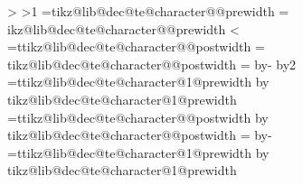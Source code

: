 {        %
        \pgfmathdivide{\the\pgf@x}{\the\pgf@y}%
        \let\tikz@lib@dec@characterwidthscale=\pgfmathresult%
        \pgfmathloop
        \ifnum\pgfmathcounter>\tikz@lib@dec@te@charactertotalcount\relax%
        \else%
        \ifnum\pgfmathcounter>1\relax%
          \pgf@x=\csname tikz@lib@dec@te@character@\pgfmathcounter @prewidth\endcsname\relax%
          \pgf@x=\tikz@lib@dec@characterwidthscale\pgf@x%
            \expandafter\edef\csname tikz@lib@dec@te@character@\pgfmathcounter @prewidth\endcsname{\the\pgf@x}%
          \fi%
          \ifnum\pgfmathcounter<\tikz@lib@dec@te@charactertotalcount\relax%
            \pgf@x=\csname tikz@lib@dec@te@character@\pgfmathcounter @postwidth\endcsname\relax%
            \pgf@x=\tikz@lib@dec@characterwidthscale\pgf@x%
            \expandafter\edef\csname tikz@lib@dec@te@character@\pgfmathcounter @postwidth\endcsname{\the\pgf@x}%
          \fi%
        \repeatpgfmathloop%
        \tikz@lib@dec@te@addwidthstoparameters%
        \let\tikz@lib@dec@te@textwidth=\pgfdecoratedpathlength%
      \else%
        \ifx\tikz@lib@dec@align\tikz@lib@dec@align@center@text%
           \pgf@x=\pgfdecoratedpathlength\relax%
           \advance\pgf@x by-\tikz@lib@dec@te@textwidth\relax%
           \ifdim\pgf@x<0pt\relax%
             \pgf@x=0pt\relax%
           \fi%
           \divide\pgf@x by2\relax%
           \pgf@xa=\csname tikz@lib@dec@te@character@1@prewidth\endcsname\relax%
           \advance\pgf@xa by\pgf@x%
           \expandafter\edef\csname tikz@lib@dec@te@character@1@prewidth\endcsname{\the\pgf@xa}%
           \pgf@xa=\csname tikz@lib@dec@te@character@\tikz@lib@dec@te@charactertotalcount @postwidth\endcsname\relax%
           \advance\pgf@xa by\pgf@x%
           \expandafter\edef\csname tikz@lib@dec@te@character@\tikz@lib@dec@te@charactertotalcount @postwidth\endcsname{\the\pgf@xa}%
        \else%
          \ifx\tikz@lib@dec@align\tikz@lib@dec@align@right@text%
            \pgf@x=\pgfdecoratedpathlength\relax%
            \advance\pgf@x by-\tikz@lib@dec@te@textwidth\relax%
            \ifdim\pgf@x<0pt\relax%
              \pgf@x=0pt\relax%
            \fi%
            \pgf@xa=\csname tikz@lib@dec@te@character@1@prewidth\endcsname\relax%
            \advance\pgf@xa by\pgf@x%
            \expandafter\edef\csname tikz@lib@dec@te@character@1@prewidth\endcsname{\the\pgf@xa}%
          \fi%
        \fi%
        \tikz@lib@dec@te@addwidthstoparameters%
      \fi%
    \fi%
  \fi%
}%


